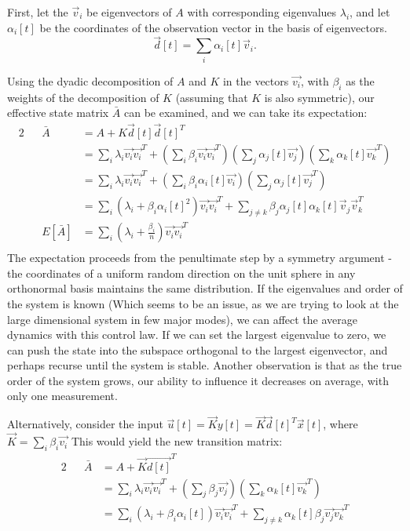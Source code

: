\documentclass[letterpaper]{article}
\theoremstyle{remark}
\newcommand{\eqn}[1]{\begin{alignat*}{2}#1\end{alignat*}}
\begin{document}
First, let the $\vec{v}_i$ be eigenvectors of $A$ with corresponding eigenvalues $\lambda_i$, and let $\alpha_i[t]$ be the coordinates of the observation vector in the basis of eigenvectors.
\[
    \vec{d}[t] = \sum_{i} \alpha_i[t] \vec{v}_i.
\]

Using the dyadic decomposition of $A$ and $K$ in the vectors $\vec{v_i}$, with $\beta_i$ as the weights of the decomposition of $K$ (assuming that $K$ is also symmetric), our effective state matrix $\bar{A} $ can be examined, and we can take its expectation:
\eqn{
    && \bar{A}&= A + K\vec{d}[t]\vec{d}[t]^T \\
    && &=\sum_i\lambda_i\vec{v_i}\vec{v_i}^T + \left(\sum_i\beta_i\vec{v_i}\vec{v_i}^T\right)\left(\sum_j\alpha_j[t]\vec{v_j}\right)\left(\sum_k\alpha_k[t]\vec{v_k}^T\right)\\
    && &=\sum_i\lambda_i\vec{v_i}\vec{v_i}^T + \left(\sum_i\beta_i\alpha_i[t]\vec{v_i}\right)\left(\sum_j\alpha_j[t]\vec{v_j}^T\right)\\
    && &=\sum_i(\lambda_i + \beta_i\alpha_i[t]^2)\vec{v_i}\vec{v_i}^T + \sum_{j\ne k}\beta_j\alpha_j[t] \alpha_k[t] \vec{v}_j \vec{v}_k^T \\
    &&E[\bar{A}] &= \sum_i(\lambda_i + \frac{\beta_i}{n})\vec{v_i}\vec{v_i}^T\\
}
The expectation proceeds from the penultimate step by a symmetry argument - the coordinates of a uniform random direction on the unit sphere in any orthonormal basis maintains the same distribution. If the eigenvalues and order of the system is known (Which seems to be an issue, as we are trying to look at the large dimensional system in few major modes), we can affect the average dynamics with this control law. If we can set the largest eigenvalue to zero, we can push the state into the subspace orthogonal to the largest eigenvector, and perhaps recurse until the system is stable. Another observation is that as the true order of the system grows, our ability to influence it decreases on average, with only one measurement.

Alternatively, consider the input $\vec{u}[t] = \vec{K}y[t] = \vec{K}\vec{d}[t]^T\vec{x}[t]$, where $\vec{K} = \sum_i\beta_i\vec{v_i}$ This would yield the new transition matrix:
\eqn{
&&\bar{A} &= A + \vec{K}\vec{d[t]}^T\\
&& &= \sum_i\lambda_i\vec{v_i}\vec{v_i}^T + \left(\sum_j\beta_j\vec{v_j}\right)\left(\sum_k\alpha_k[t]\vec{v_k}^T\right)\\
&& &=\sum_i(\lambda_i+\beta_i\alpha_i[t])\vec{v_i}\vec{v_i}^T + \sum_{j\ne k}\alpha_k[t]\beta_j\vec{v_j}\vec{v_k}^T 
}
\end{document}
